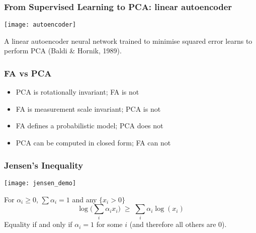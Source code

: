 \begin{frame}
\frametitle{From Supervised Learning to PCA: linear autoencoder}

\vspace{4mm}
\centerline{\texttt{[image: autoencoder]}}

\vspace{4mm}
A linear autoencoder neural network trained to minimise squared error
learns to perform PCA (Baldi \& Hornik, 1989).
\end{frame}

\begin{frame}
\frametitle{FA vs PCA}
\vfill
\begin{itemize}

\item PCA is rotationally invariant; FA is not

\item FA is measurement scale invariant; PCA is not

\item FA defines a probabilistic model; PCA does not

\item PCA can be computed in closed form; FA can not 
\end{itemize}
\vfill
\end{frame}

\begin{frame}
\frametitle{Jensen's Inequality}

\centerline{\texttt{[image: jensen\_demo]}}

\vfill

For $\alpha_i \ge 0$, $\sum \alpha_i = 1$ and any $\{x_i > 0\}$
%
\[
\log \big( \sum_i \alpha_i x_i \big)\;\ge\;\sum_i \alpha_i \log(x_i)
\]
%
Equality if and only if $\alpha_i =  1$ for some $i$ (and therefore
all others are 0).
\end{frame}


